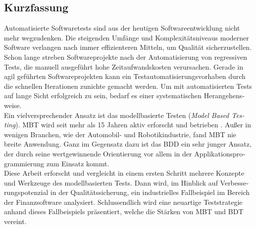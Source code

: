 
\cleardoublepage
{}


%

\begin{otherlanguage}{ngerman}

\chapter*{Kurzfassung}

Automatisierte Softwaretests sind aus der heutigen Softwareentwicklung nicht mehr wegzudenken. Die steigenden Umfänge und Komplexitätsniveaus moderner Software verlangen nach immer effizienteren Mitteln, um Qualität sicherzustellen. Schon lange streben Softwareprojekte nach der Automatisierung von regressiven Tests, die manuell ausgeführt hohe Zeitaufwandskosten verursachen. Gerade in agil geführten Softwareprojekten kann ein Testautomatisierungsvorhaben durch die schnellen Iterationen zunichte gemacht werden. Um mit automatisierten Tests auf lange Sicht erfolgreich zu sein, bedarf es einer systematischen Herangehensweise.\\

Ein vielversprechender Ansatz ist das modellbasierte Testen (\textit{Model Based Testing}). \Gls{MBT} wird seit mehr als 15 Jahren aktiv erforscht und betrieben \cite{utting_practical_2007}. Außer in wenigen Branchen, wie der Automobil- und Robotikindustrie, fand \Gls{MBT} nie breite Anwendung. Ganz im Gegensatz dazu ist das \Gls{BDD} ein sehr junger Ansatz, der durch seine wertgewinnende Orientierung vor allem in der Applikationsprogrammierung zum Einsatz kommt.\\

Diese Arbeit erforscht und vergleicht in einem ersten Schritt mehrere Konzepte und Werkzeuge des modellbasierten Tests. Dann wird, im Hinblick auf Verbesserungspotenzial in der Qualitätssicherung, ein industrielles Fallbeispiel im Bereich der Finanzsoftware analysiert. Schlussendlich wird eine neuartige Teststrategie anhand dieses Fallbeispiels präsentiert, welche die Stärken von \Gls{MBT} und \Gls{BDT} vereint. \\


\end{otherlanguage}
